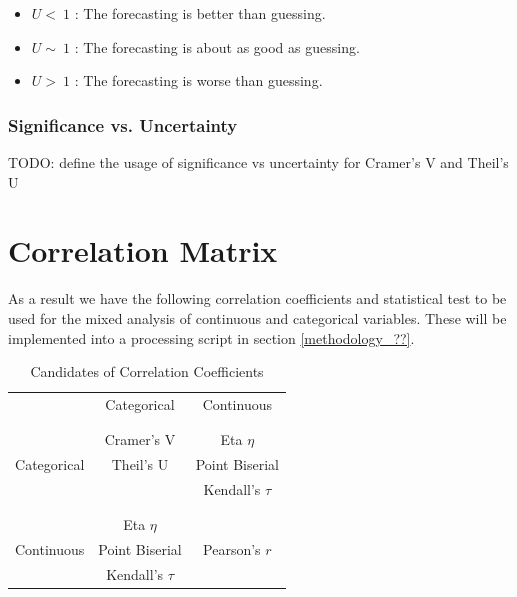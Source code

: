 \documentclass[a4paper,headsepline,footsepline,fontsize=11pt,BCOR=12mm,DIV=12]{report}
\begin{document}
\begin{itemize}
	\item $U < \: 1$ : The forecasting is better than guessing.
	\item $U \sim \: 1$ : The forecasting is about as good as guessing.
	\item $U > \: 1$ : The forecasting is worse than guessing.
\end{itemize}

\subsubsection{Significance vs. Uncertainty}
\label{correlation_significance_uncertainty}

TODO: define the usage of significance vs uncertainty for Cramer's V and Theil's U

\section{Correlation Matrix}
As a result we have the following correlation coefficients and statistical test to be used for the mixed analysis of continuous and categorical variables. These will be implemented into a processing script in section \ref{methodology_??}.

\bigskip

\begin{table}[ht]
	\centering
	\begin{tabular}{c|c|c}
					& Categorical 		& Continuous\\
		\\[-1em]
		\hline
		\\[-1em]
		 			& Cramer’s V  	& Eta $\eta$	\\
		Categorical	& Theil’s U		& Point Biserial\\
					& 				& Kendall's $\tau$\\
		\\[-1em]
		\hline
		\\[-1em]
					& Eta $\eta$		  			& \\
		Continuous	& Point Biserial		& Pearson's $r$\\
				& Kendall's $\tau$		& \\
	\end{tabular}
	\caption{\label{tab:table-name}Candidates of Correlation Coefficients}
\end{table}
	
\end{document}
